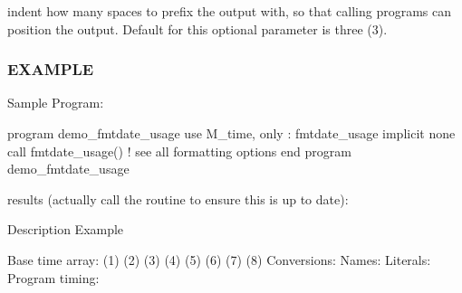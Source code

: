 indent how many spaces to prefix the output with, so that calling programs can position the output. Default for this optional parameter is three (3).

\subsubsection*{E\+X\+A\+M\+P\+LE}

\begin{DoxyVerb}Sample Program:

 program demo_fmtdate_usage
 use M_time, only : fmtdate_usage
 implicit none
    call fmtdate_usage() ! see all formatting options
 end program demo_fmtdate_usage

results (actually call the routine to ensure this is up to date):

 Description                                        Example

 Base time array:
 (1) %
 (2) %
 (3) %
 (4) %
 (5) %
 (6) %
 (7) %
 (8) %
 Conversions:
  Names:
  Literals:
  Program timing:


\end{DoxyVerb}
